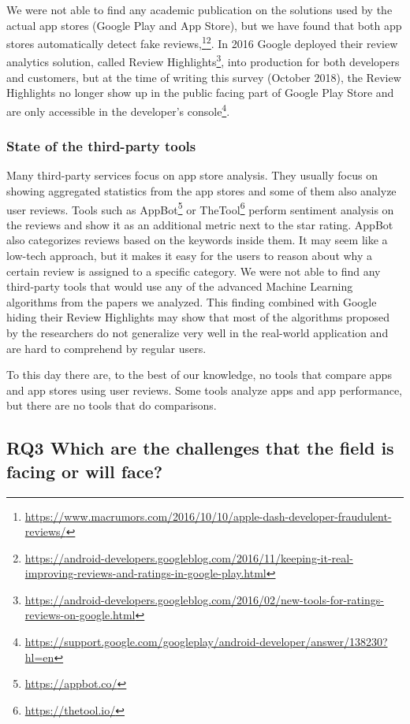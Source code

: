 \documentclass[]{book}
\let\rmarkdownfootnote\footnote%
\def\footnote{\protect\rmarkdownfootnote}
\begin{document}
We were not able to find any academic publication on the solutions used
by the actual app stores (Google Play and App Store), but we have found
that both app stores automatically detect fake reviews,\footnote{\url{https://www.macrumors.com/2016/10/10/apple-dash-developer-fraudulent-reviews/}}\footnote{\url{https://android-developers.googleblog.com/2016/11/keeping-it-real-improving-reviews-and-ratings-in-google-play.html}}.
In 2016 Google deployed their review analytics solution, called Review
Highlights\footnote{\url{https://android-developers.googleblog.com/2016/02/new-tools-for-ratings-reviews-on-google.html}},
into production for both developers and customers, but at the time of
writing this survey (October 2018), the Review Highlights no longer show
up in the public facing part of Google Play Store and are only
accessible in the developer's console\footnote{\url{https://support.google.com/googleplay/android-developer/answer/138230?hl=en}}.

\subsubsection{State of the third-party
tools}\label{state-of-the-third-party-tools}

Many third-party services focus on app store analysis. They usually
focus on showing aggregated statistics from the app stores and some of
them also analyze user reviews. Tools such as AppBot\footnote{\url{https://appbot.co/}}
or TheTool\footnote{\url{https://thetool.io/}} perform sentiment
analysis on the reviews and show it as an additional metric next to the
star rating. AppBot also categorizes reviews based on the keywords
inside them. It may seem like a low-tech approach, but it makes it easy
for the users to reason about why a certain review is assigned to a
specific category. We were not able to find any third-party tools that
would use any of the advanced Machine Learning algorithms from the
papers we analyzed. This finding combined with Google hiding their
Review Highlights may show that most of the algorithms proposed by the
researchers do not generalize very well in the real-world application
and are hard to comprehend by regular users.

To this day there are, to the best of our knowledge, no tools that
compare apps and app stores using user reviews. Some tools analyze apps
and app performance, but there are no tools that do comparisons.

\subsection{\texorpdfstring{\textbf{RQ3} Which are the challenges that
the field is facing or will
face?}{RQ3 Which are the challenges that the field is facing or will face?}}\label{rq3-which-are-the-challenges-that-the-field-is-facing-or-will-face}
\end{document}
